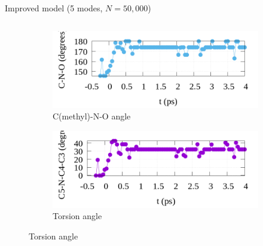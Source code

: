 \documentclass{beamer}
\begin{document}
\begin{frame}{Improved model (5 modes, $N=50{,}000$)}
\begin{columns}
\begin{column}{0.5\textwidth}
\begin{figure}
\begin{subfigure}[b]{\textwidth}
					\centering
					\includegraphics[width=\textwidth]{figures/argmin_angle_0+vstrongmodes_50000.png}
					\caption{C(methyl)-N-O angle}
				\end{subfigure}
				\begin{subfigure}[b]{\textwidth}
					\centering
					\includegraphics[width=\textwidth]{figures/argmin_torsion_0+vstrongmodes_50000.png}
					\caption{Torsion angle}
				\end{subfigure}
			\end{figure}
		\end{column}
		

\end{columns}
\end{frame}
\end{document}
